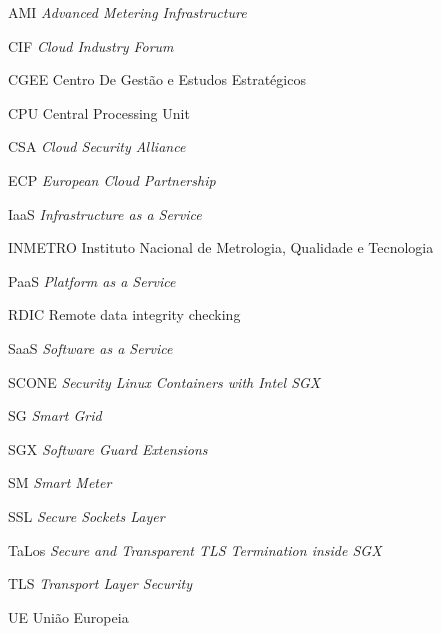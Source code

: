 \documentclass[
	12pt,					%
	oneside,					%
	a4paper,					%
	chapter=TITLE,			%
	section=TITLE,			%
	english,					%
	brazil					%
	]{abntex2}
\begin{document}
\frenchspacing

\pretextual



\imprimirfolhaderosto*





%

%





\listoffigures*
\cleardoublepage

\listoftables*
\cleardoublepage

\begin{siglas}

  \item[AMI]\textit{Advanced Metering Infrastructure}
  \item[CIF]\textit{Cloud Industry Forum}
  \item[CGEE]{Centro De Gestão e Estudos Estratégicos}
  \item[CPU]{Central Processing Unit}
  \item[CSA]\textit{Cloud Security Alliance} 
  \item[ECP]\textit{European Cloud Partnership}
  \item[IaaS]\textit{Infrastructure as a Service}
  \item[INMETRO]{Instituto Nacional de Metrologia, Qualidade e Tecnologia}
  \item[PaaS]\textit{Platform as a Service}
  \item[RDIC]Remote data integrity checking
  \item[SaaS]\textit{Software as a Service}
  \item[SCONE]\textit{Security Linux Containers with Intel SGX}
  \item[SG]\textit{Smart Grid}
  \item[SGX]\textit{Software Guard Extensions}
  \item[SM]\textit{Smart Meter}
  \item[SSL]\textit{Secure Sockets Layer}
  \item[TaLos]\textit{Secure and Transparent TLS Termination inside SGX}
  \item[TLS]\textit{Transport Layer Security}
  \item[UE]{União Europeia}
  
\end{siglas}
\end{document}
